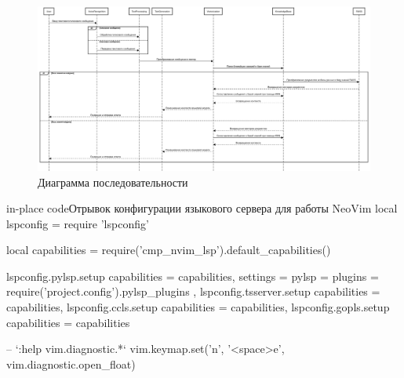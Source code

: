 \begin{figure}[H]
    \centering
    \includegraphics[width=1.2\textwidth, angle=90]{Диаграмма последовательности.png}
    \caption{Диаграмма последовательности}\label{Диаграмма последовательности.png}
\end{figure}


\begin{codepiece}{in-place code}{Отрывок конфигурации языкового сервера для работы NeoVim}
local lspconfig = require 'lspconfig'

local capabilities = require('cmp_nvim_lsp').default_capabilities()

lspconfig.pylsp.setup {
  capabilities = capabilities,
  settings = { pylsp = { plugins = require('project.config').pylsp_plugins } },
}
lspconfig.tsserver.setup {
  capabilities = capabilities,
}
lspconfig.ccls.setup {
  capabilities = capabilities,
}
lspconfig.gopls.setup {
  capabilities = capabilities
}

-- `:help vim.diagnostic.*`
vim.keymap.set('n', '<space>e', vim.diagnostic.open_float)
\end{codepiece}


